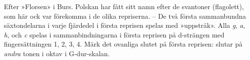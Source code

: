 Efter »Florsen» i Burs. Polskan har fått sitt namn efter de svantoner (flagolett),
som här ock var förekomma i de olika repriserna. -- De två första
sammanbundna säxtondelarna i varje fjärdedel i första reprisen
spelas med »uppstråk». Alla \textit{g}, \textit{a}, \textit{h}, och \textit{c} spelas i sammanbindningarna
i första reprisen på d-strängen med fingersättningen 1, 2, 3, 4.
Märk det ovanliga slutet på första reprisen: slutar på \textit{andra}
tonen i oktav i G-dur-skalan.
